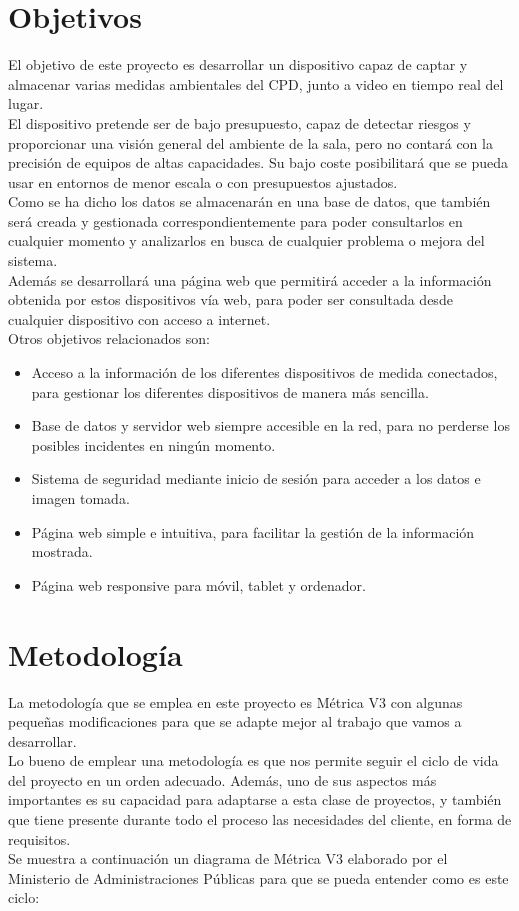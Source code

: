\section{Objetivos}
El objetivo de este proyecto es desarrollar un dispositivo capaz de captar y almacenar varias medidas ambientales del CPD, junto a video en tiempo real del lugar. \\ El dispositivo pretende ser de bajo presupuesto, capaz de detectar riesgos y proporcionar una visión general del ambiente de la sala, pero no contará con la precisión de equipos de altas capacidades. Su bajo coste posibilitará que se pueda usar en entornos de menor escala o con presupuestos ajustados.  \\ Como se ha dicho los datos se almacenarán en una base de datos, que también será creada y gestionada correspondientemente para poder consultarlos en cualquier momento y analizarlos en busca de cualquier problema o mejora del sistema. \\ Además se desarrollará una página web que permitirá acceder a la información obtenida por estos dispositivos vía web, para poder ser consultada desde cualquier dispositivo con acceso a internet. \\ Otros objetivos relacionados son:
\begin{itemize}
    \item Acceso a la información de los diferentes dispositivos de medida conectados, para gestionar los diferentes dispositivos de manera más sencilla.
    \item Base de datos y servidor web siempre accesible en la red, para no perderse los posibles incidentes en ningún momento.
    \item Sistema de seguridad mediante inicio de sesión para acceder a los datos e imagen tomada.
    \item Página web simple e intuitiva, para facilitar la gestión de la información mostrada.
    \item Página web responsive para móvil, tablet y ordenador.
\end{itemize}

\section{Metodología}
La metodología que se emplea en este proyecto es Métrica V3 \cite{portal_administracion_electronica_metrica_nodate} con algunas pequeñas modificaciones para que se adapte mejor al trabajo que vamos a desarrollar. \\ Lo bueno de emplear una metodología es que nos permite seguir el ciclo de vida del proyecto en un orden adecuado. Además, uno de sus aspectos más importantes es su capacidad para adaptarse a esta clase de proyectos, y también que tiene presente durante todo el proceso las necesidades del cliente, en forma de requisitos. \\ Se muestra a continuación un diagrama de Métrica V3 elaborado por el Ministerio de Administraciones Públicas para que se pueda entender como es este ciclo:

